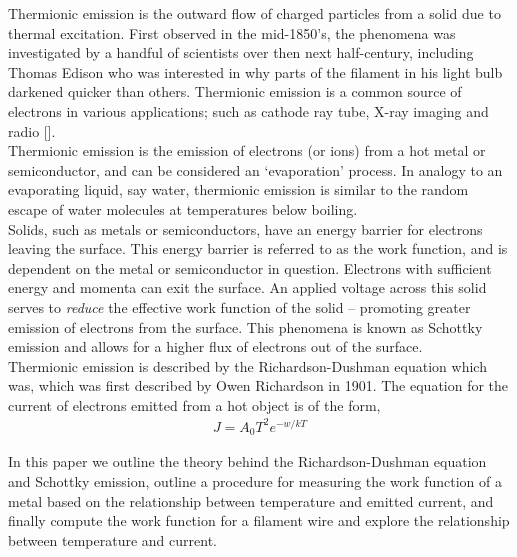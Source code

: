Thermionic emission is the outward flow of charged particles from a solid due to thermal excitation. First observed in the mid-1850's, the phenomena was investigated by a handful of scientists over then next half-century, including Thomas Edison who was interested in why parts of the filament in his light bulb darkened quicker than others. Thermionic emission is a common source of electrons in various applications; such as cathode ray tube, X-ray imaging and radio [].\\

Thermionic emission is the emission of electrons (or ions) from a hot metal or semiconductor, and can be considered an `evaporation' process. In analogy to an evaporating liquid, say water, thermionic emission is similar to the random escape of water molecules at temperatures below boiling. \\

Solids, such as metals or semiconductors, have an energy barrier for electrons leaving the surface. This energy barrier is referred to as the work function, and is dependent on the metal or semiconductor in question. Electrons with sufficient energy and momenta can exit the surface. An applied voltage across this solid serves to \textit{reduce} the effective work function of the solid -- promoting greater emission of electrons from the surface. This phenomena is known as Schottky emission and allows for a higher flux of electrons out of the surface.\\

Thermionic emission is described by the Richardson-Dushman equation which was, which was first described by Owen Richardson in 1901. The equation for the current of electrons emitted from a hot object is of the form,
\begin{align}
    J = A_0 T^2 e^{-w/kT}
\end{align}

In this paper we outline the theory behind the Richardson-Dushman equation and Schottky emission, outline a procedure for measuring the work function of a metal based on the relationship between temperature and emitted current, and finally compute the work function for a filament wire and explore the relationship between temperature and current.\\